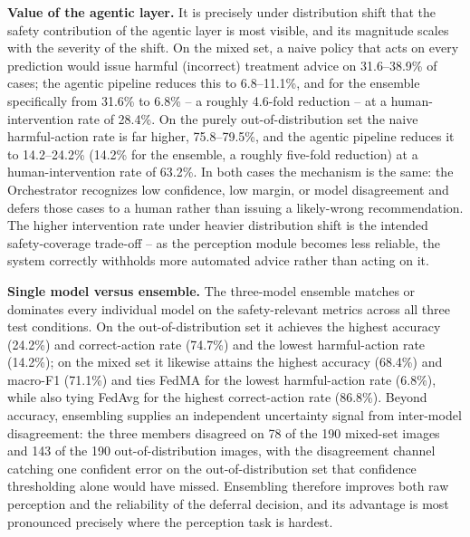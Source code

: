 \documentclass[conference]{IEEEtran}
\begin{document}
\textbf{Value of the agentic layer.} It is precisely under distribution shift that the safety contribution of the agentic layer is most visible, and its magnitude scales with the severity of the shift. On the mixed set, a naive policy that acts on every prediction would issue harmful (incorrect) treatment advice on 31.6--38.9\% of cases; the agentic pipeline reduces this to 6.8--11.1\%, and for the ensemble specifically from 31.6\% to 6.8\% -- a roughly 4.6-fold reduction -- at a human-intervention rate of 28.4\%. On the purely out-of-distribution set the naive harmful-action rate is far higher, 75.8--79.5\%, and the agentic pipeline reduces it to 14.2--24.2\% (14.2\% for the ensemble, a roughly five-fold reduction) at a human-intervention rate of 63.2\%. In both cases the mechanism is the same: the Orchestrator recognizes low confidence, low margin, or model disagreement and defers those cases to a human rather than issuing a likely-wrong recommendation. The higher intervention rate under heavier distribution shift is the intended safety-coverage trade-off -- as the perception module becomes less reliable, the system correctly withholds more automated advice rather than acting on it.

\textbf{Single model versus ensemble.} The three-model ensemble matches or dominates every individual model on the safety-relevant metrics across all three test conditions. On the out-of-distribution set it achieves the highest accuracy (24.2\%) and correct-action rate (74.7\%) and the lowest harmful-action rate (14.2\%); on the mixed set it likewise attains the highest accuracy (68.4\%) and macro-F1 (71.1\%) and ties FedMA for the lowest harmful-action rate (6.8\%), while also tying FedAvg for the highest correct-action rate (86.8\%). Beyond accuracy, ensembling supplies an independent uncertainty signal from inter-model disagreement: the three members disagreed on 78 of the 190 mixed-set images and 143 of the 190 out-of-distribution images, with the disagreement channel catching one confident error on the out-of-distribution set that confidence thresholding alone would have missed. Ensembling therefore improves both raw perception and the reliability of the deferral decision, and its advantage is most pronounced precisely where the perception task is hardest.
\end{document}

